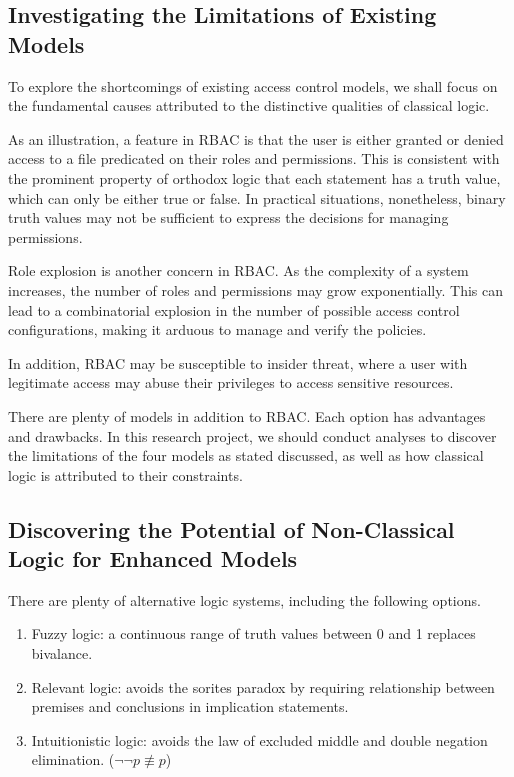 \documentclass{article}
\begin{document}
\subsection*{Investigating the Limitations of Existing Models}

To explore the shortcomings of existing access control models, we shall
focus on the fundamental causes attributed to the distinctive qualities of
classical logic.

As an illustration, a feature in RBAC is that the user is either granted or
denied access to a file predicated on their roles and permissions. This is
consistent with the prominent property of orthodox logic that each statement
has a truth value, which can only be either true or false. In practical
situations, nonetheless, binary truth values may not be sufficient to express
the decisions for managing permissions.

Role explosion is another concern in RBAC. As the complexity of a system
increases, the number of roles and permissions may grow exponentially. This
can lead to a combinatorial explosion in the number of possible access
control configurations, making it arduous to manage and verify the
policies.\cite{role-explosion}

In addition, RBAC may be susceptible to insider threat, where a user
with legitimate access may abuse their privileges to access sensitive
resources.\cite{insider-threat}

There are plenty of models in addition to RBAC. Each option has advantages
and drawbacks. In this research project, we should conduct analyses to
discover the limitations of the four models as stated discussed, as well as
how classical logic is attributed to their constraints.

\subsection*{Discovering the Potential of Non-Classical Logic for Enhanced
Models}

There are plenty of alternative logic systems, including the following options.
\begin{enumerate}
    \item Fuzzy logic: a continuous range of truth values between 0 and 1
    replaces bivalance.\cite{fuzzy} \item Relevant logic: avoids the sorites
    paradox by requiring relationship between premises and conclusions in
    implication statements.\cite{relevant} \item Intuitionistic logic: avoids
    the law of excluded middle and double negation elimination. ($\neg\neg
    p \not\equiv p$)\cite{intuitionistic}
\end{enumerate}
\end{document}
